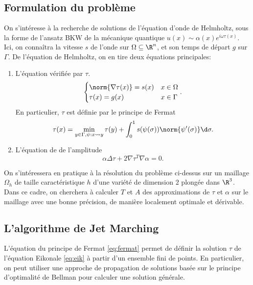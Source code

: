 \documentclass[math, info]{mpb-cours}
\begin{document}
\subsection{Formulation du problème}
On s'intéresse à la recherche de solutions de l'équation d'onde de Helmholtz, sous la forme de l'ansatz
BKW de la mécanique quantique $u(x) \sim \alpha(x)e^{i\omega\tau(x)}$.
Ici, on connaîtra la vitesse $s$ de l'onde sur $\Omega \subseteq \R^{n}$, et son temps de départ $g$ sur
$\Gamma$.
De l'équation de Helmholtz, on en tire deux équations principales:
\begin{enumerate}
	\item L'équation  vérifiée par $\tau$.
	      \begin{equation}
		      \begin{cases}
			      \norm{\nabla \tau(x)} = s(x) & x \in \Omega \\
			      \tau(x) = g(x)               & x\in \Gamma
		      \end{cases}. \label{eq:eik}
	      \end{equation}
	      En particulier, $\tau$ est définie par le principe de Fermat
	      \begin{equation}
		      \tau(x) = \min_{y\in \Gamma, \psi: x \rightsquigarrow y} \tau(y) + \int_{0}^{1} s(\psi(\sigma))\norm{\psi'(\sigma)}\d\sigma.\label{eq:fermat}
	      \end{equation}
	\item L'équation de  de l'amplitude
	      \begin{equation}
		      \alpha\Delta\tau + 2\nabla\tau^{T}\nabla\alpha = 0.\label{eq:amp}
	      \end{equation}
\end{enumerate}

\smallskip

On s'intéressera en pratique à la résolution du problème ci-dessus sur un maillage $\Omega_{h}$ de taille
caractéristique $h$ d'une variété de dimension $2$ plongée dans $\R^{3}$.
Dans ce cadre, on cherchera à calculer $T$ et $A$ des approximations de $\tau$ et $\alpha$ sur le maillage
avec une bonne précision, de manière localement optimale et dérivable.

\subsection{L'algorithme de Jet Marching}
L'équation du principe de Fermat \eqref{eq:fermat} permet de définir la solution $\tau$ de l'équation
Eikonale \eqref{eq:eik} à partir d'un ensemble fini de points.
En particulier, on peut utiliser une approche de propagation de solutions basée sur le principe d'optimalité
de Bellman pour calculer une solution générale.
\end{document}

